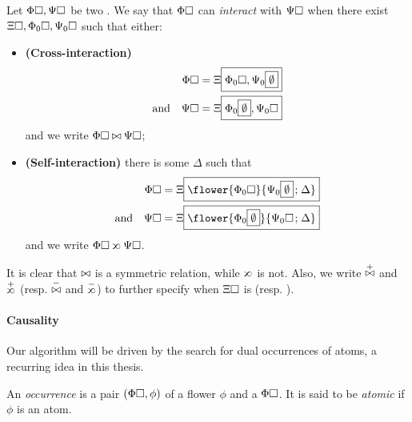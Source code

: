\begin{scope}

\begin{definition}[Interaction]
  
  Let $\Phi\square, \Psi\square$ be two . We say that $\Phi\square$ can
  \emph{interact} with $\Psi\square$ when there exist  $\Xi\square,
  \Phi_0\square, \Psi_0\square$ such that either:
  \begin{itemize}
    \item \textbf{(Cross-interaction)}
    \begin{align*}
      \Phi\square &= \Xi\fbox{$\Phi_0\square, \Psi_0\fbox{$\emptyset$}$} \\
      \text{and}\quad \Psi\square &= \Xi\fbox{$\Phi_0\fbox{$\emptyset$}, \Psi_0\square$}
    \end{align*}
    and we write $\Phi\square \mathbin{\bowtie} \Psi\square$;
    \item \textbf{(Self-interaction)} there is some $\Delta$ such that
    \begin{align*}
      \Phi\hole &= \Xi\select{\flower{\Phi_0\hole}{\Psi_0\select{\emptyset} \sep \Delta}} \\
      \text{and}\quad \Psi\hole &= \Xi\select{\flower{\Phi_0\select{\emptyset}}{\Psi_0\hole \sep \Delta}}
    \end{align*}
    and we write $\Phi\hole \sinter \Psi\hole$.
  \end{itemize}
  It is clear that $\mathbin{\bowtie}$ is a symmetric relation, while $\sinter$ is not.
  Also, we write $\cinterpos$ and $\sinterpos$ (resp. $\cinterneg$ and
  $\sinterneg$) to further specify when $\Xi\square$ is  (resp. ).
\end{definition}

\paragraph{Causality}

Our algorithm will be driven by the search for dual occurrences of atoms, a
recurring idea in this thesis.

\begin{definition}[Occurrence]
  
  An \emph{occurrence} is a pair $(\Phi\square, \phi)$ of a flower $\phi$ and a
   $\Phi\square$. It is said to be \emph{atomic} if $\phi$ is an atom.
\end{definition}


\end{scope}
